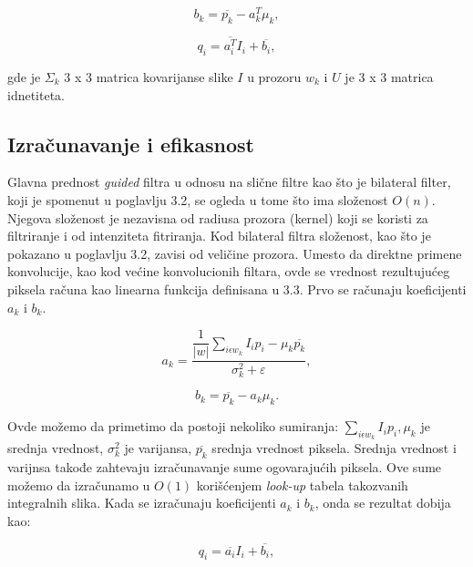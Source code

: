 \documentclass[a4paper,12pt,titlepage]{article}
\begin{document}
\begin{equation}\label{eq:gf12}
	b_k = \overline{p_k} - a_k^T \mu_k,
\end{equation}

\begin{equation}\label{eq:gf13}
	q_i = \overline{a_i^T} I_i + \overline{b_i},
\end{equation}

gde je $\Sigma_k$ 3 x 3 matrica kovarijanse slike $I$ u prozoru $w_k$ i $U$ je 3 x 3 matrica idnetiteta.

\subsection{Izračunavanje i efikasnost}%

Glavna prednost \emph{guided} filtra u odnosu na slične filtre kao što je bilateral filter, koji je spomenut u poglavlju 3.2, se ogleda u tome što ima složenost $O(n)$. Njegova složenost je nezavisna od radiusa prozora (kernel) koji se koristi za filtriranje i od intenziteta fitriranja. Kod bilateral filtra složenost, kao što je pokazano u poglavlju 3.2, zavisi od veličine prozora. Umesto da direktne primene konvolucije, kao kod većine konvolucionih filtara, ovde se vrednost rezultujućeg piksela računa kao linearna funkcija definisana u 3.3. Prvo se računaju koeficijenti $a_k$ i $b_k$.

\begin{equation}\label{eq:gf14}
	a_k = \dfrac{\dfrac{1}{|w|} \sum_{i \epsilon w_k} I_ip_i - \mu_k \overline{p_k}}{\sigma_k^2 + \varepsilon},
\end{equation}

\begin{equation}\label{eq:gf15}
	b_k = \overline{p_k} - a_k \mu_k.
\end{equation}

Ovde možemo da primetimo da postoji nekoliko sumiranja:  $\sum_{i \epsilon w_k} I_ip_i, \mu_k$ je srednja vrednost, $\sigma_k^2$ je varijansa, $\overline{p_k}$ srednja vrednost piksela. Srednja vrednost i varijnsa takođe zahtevaju izračunavanje sume ogovarajućih piksela. Ove sume možemo da izračunamo u $O(1)$ korišćenjem \emph{look-up} tabela takozvanih integralnih slika. Kada se izračunaju koeficijenti $a_k$ i $b_k$, onda se rezultat dobija kao:

\begin{equation}\label{eq:gf16}
	q_i = \overline{a_i}I_i + \overline{b_i},
\end{equation}
\end{document}
